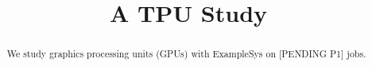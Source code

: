 \documentclass{article}
\title{A TPU Study}
\newcommand{\examplesys}{ExampleSys}
\newcommand{\pending}[1]{[PENDING #1]}
\begin{document}
\maketitle
\begin{abstract}
We study graphics processing units (GPUs) with \examplesys{} on \pending{P1} jobs.
\end{abstract}



\end{document}
